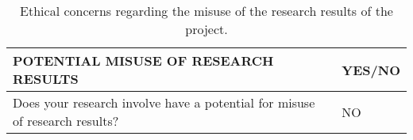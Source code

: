 \begin{table}[H]
	\centering
	\begin{tabular}[H]{>{\arraybackslash}p{10cm}
			>{\arraybackslash}p{3cm} }
		\toprule[2pt]
		
		\textbf{POTENTIAL MISUSE OF RESEARCH RESULTS} & \textbf{YES/NO} \\
		\midrule[1.5pt]
		Does your research involve have a potential for misuse of research results? & NO\\
		\bottomrule[2pt]		
	\end{tabular}
	\caption[Ethics - Misuse of results]{Ethical concerns regarding the misuse of the research results of the project.}
	\label{Ethics_Misuse}
\end{table}